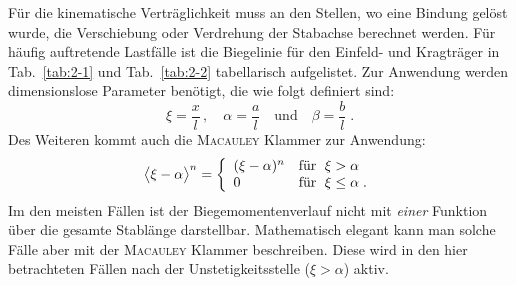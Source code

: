 Für die kinematische Verträglichkeit muss an den Stellen, wo eine Bindung gelöst wurde, die Verschiebung oder Verdrehung der Stabachse berechnet werden.
Für häufig auftretende Lastfälle ist die Biegelinie für den Einfeld- und Kragträger in Tab.~\ref{tab:2-1} und Tab.~\ref{tab:2-2} tabellarisch aufgelistet.
Zur Anwendung werden dimensionslose Parameter benötigt, die wie folgt definiert sind:
%
\begin{equation}
	\xi=\dfrac{x}{l}\, , \quad \alpha=\dfrac{a}{l}\quad\text{und}\quad \beta=\dfrac{b}{l}\; .
\end{equation}
%
Des Weiteren kommt auch die
\textsc{Macauley} Klammer zur Anwendung:
%
\begin{equation}
	\big\langle \xi-\alpha\big\rangle^n = 
	\left\{
	\begin{array}{l l}
	(\xi-\alpha)^n & \text{für }\;\xi>\alpha\\
	0	& \text{für }\;\xi\leq\alpha\; .\\ 
	\end{array}
	\right.
\end{equation}
%
Im den meisten Fällen ist der Biegemomentenverlauf nicht mit \emph{einer} Funktion über die gesamte Stablänge darstellbar.
Mathematisch elegant kann man solche Fälle aber mit der \textsc{Macauley} Klammer beschreiben.
Diese wird in den hier betrachteten Fällen nach der Unstetigkeitsstelle ($\xi>\alpha$) aktiv.

